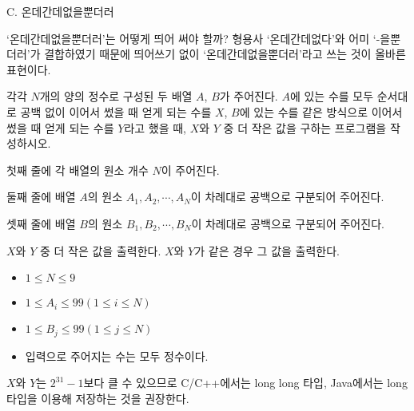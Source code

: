 \def\probtitle{온데간데없을뿐더러}
\def\probno{C} %

\begin{problem}{\probno{}. \probtitle{}}

`온데간데없을뿐더러’는 어떻게 띄어 써야 할까? 형용사 `온데간데없다’와 어미 `-을뿐더러’가 결합하였기 때문에 띄어쓰기 없이 `온데간데없을뿐더러’라고 쓰는 것이 올바른 표현이다.

각각 $N$개의 양의 정수로 구성된 두 배열 $A$, $B$가 주어진다. $A$에 있는 수를 모두 순서대로 공백 없이 이어서 썼을 때 얻게 되는 수를 $X$, $B$에 있는 수를 같은 방식으로 이어서 썼을 때 얻게 되는 수를 $Y$라고 했을 때, $X$와 $Y$ 중 더 작은 값을 구하는 프로그램을 작성하시오.

\InputFile

첫째 줄에 각 배열의 원소 개수 $N$이 주어진다.

둘째 줄에 배열 $A$의 원소 $A_1, A_2, \cdots, A_N$이 차례대로 공백으로 구분되어 주어진다.

셋째 줄에 배열 $B$의 원소 $B_1, B_2, \cdots, B_N$이 차례대로 공백으로 구분되어 주어진다.

\OutputFile

$X$와 $Y$ 중 더 작은 값을 출력한다. $X$와 $Y$가 같은 경우 그 값을 출력한다.

\Constraints

\begin{itemize}[topsep=0pt,noitemsep]
    \item $1 \le N \le 9$
    \item $1 \le A_i \le 99 (1 \le i \le N)$
    \item $1 \le B_j \le 99 (1 \le j \le N)$
    \item 입력으로 주어지는 수는 모두 정수이다.
\end{itemize}

\Example

\begin{example}
\end{example}


\Notes
$X$와 $Y$는 $2^{31} - 1$보다 클 수 있으므로 C/C++에서는 long long 타입, Java에서는 long 타입을 이용해 저장하는 것을 권장한다.

\end{problem}